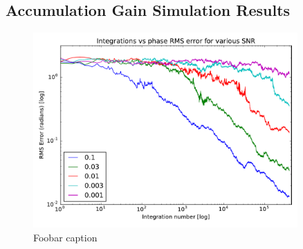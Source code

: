 \subsection{Accumulation Gain Simulation Results}

\begin{figure}
  \centering
  \includegraphics[width=0.9\textwidth]{integration-vs-error-combined-5}
  \caption{Foobar caption}
\end{figure}


